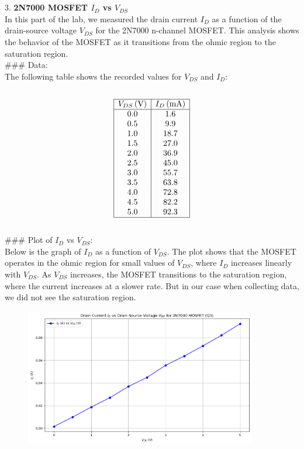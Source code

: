 \documentclass{article}
\begin{document}
\\ \\
3. \textbf{2N7000 MOSFET \( I_D \) vs \( V_{DS} \)}
\\
In this part of the lab, we measured the drain current \( I_D \) as a function of the drain-source voltage \( V_{DS} \) for the 2N7000 n-channel MOSFET. This analysis shows the behavior of the MOSFET as it transitions from the ohmic region to the saturation region.
\\ 
### Data: \\ 
The following table shows the recorded values for \( V_{DS} \) and \( I_D \): \\ 
\\ 
\[
\begin{array}{|c|c|}
\hline
V_{DS} \, (\text{V}) & I_D \, (\text{mA}) \\
\hline
0.0 & 1.6 \\
0.5 & 9.9 \\
1.0 & 18.7 \\
1.5 & 27.0 \\
2.0 & 36.9 \\
2.5 & 45.0 \\
3.0 & 55.7 \\
3.5 & 63.8 \\
4.0 & 72.8 \\
4.5 & 82.2 \\
5.0 & 92.3 \\
\hline
\end{array}
\]
\\ 
### Plot of \( I_D \) vs \( V_{DS} \):\\ 
Below is the graph of \( I_D \) as a function of \( V_{DS} \). The plot shows that the MOSFET operates in the ohmic region 
for small values of \( V_{DS} \), where \( I_D \) increases linearly with \( V_{DS} \). As \( V_{DS} \) increases, 
the MOSFET transitions to the saturation region, where the current increases at a slower rate.
But in our case when collecting data, we did not see the saturation region.
\\ 
\begin{figure}[H]
    \centering
    \includegraphics[width=0.9\textwidth]{./img/Lab6_3_idVSVds.png}
    \caption{}
    \label{fig:graph1} 
\end{figure}
\end{document}
